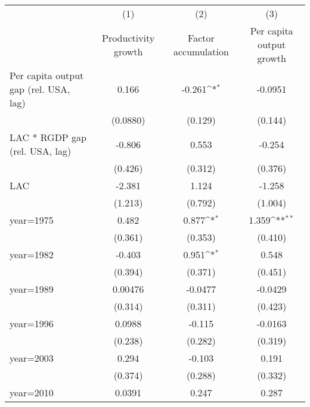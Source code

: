 {
\def\sym#1{\ifmmode^{#1}\else\(^{#1}\)\fi}
\begin{tabular}{l*{3}{c}}
\hline\hline
                    &\multicolumn{1}{c}{(1)}&\multicolumn{1}{c}{(2)}&\multicolumn{1}{c}{(3)}\\
                    &\multicolumn{1}{c}{Productivity growth}&\multicolumn{1}{c}{Factor accumulation}&\multicolumn{1}{c}{Per capita output growth}\\
\hline
Per capita output gap (rel. USA, lag)&       0.166         &      -0.261\sym{*}  &     -0.0951         \\
                    &    (0.0880)         &     (0.129)         &     (0.144)         \\
[1em]
LAC * RGDP gap (rel. USA, lag)&      -0.806         &       0.553         &      -0.254         \\
                    &     (0.426)         &     (0.312)         &     (0.376)         \\
[1em]
LAC                 &      -2.381         &       1.124         &      -1.258         \\
                    &     (1.213)         &     (0.792)         &     (1.004)         \\
[1em]
year=1975           &       0.482         &       0.877\sym{*}  &       1.359\sym{**} \\
                    &     (0.361)         &     (0.353)         &     (0.410)         \\
[1em]
year=1982           &      -0.403         &       0.951\sym{*}  &       0.548         \\
                    &     (0.394)         &     (0.371)         &     (0.451)         \\
[1em]
year=1989           &     0.00476         &     -0.0477         &     -0.0429         \\
                    &     (0.314)         &     (0.311)         &     (0.423)         \\
[1em]
year=1996           &      0.0988         &      -0.115         &     -0.0163         \\
                    &     (0.238)         &     (0.282)         &     (0.319)         \\
[1em]
year=2003           &       0.294         &      -0.103         &       0.191         \\
                    &     (0.374)         &     (0.288)         &     (0.332)         \\
[1em]
year=2010           &      0.0391         &       0.247         &       0.287         \\

\end{tabular}}
